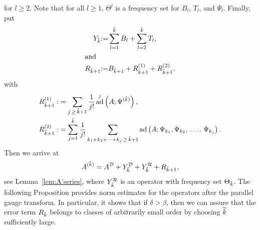 \documentclass[10pt]{amsart}
\theoremstyle{definition}\newtheorem{defi}[theo]{Definition}\newtheorem{rema}[theo]{Remark}\newtheorem{exam}[theo]{Example}\newtheorem{nota}[theo]{Notation}
\DeclareMathOperator{\ad}{ad}
\newcommand{\CD}{\mathcal{D}}
\newcommand{\CR}{\mathcal{R}}
\let\oldtilde\tilde
\renewcommand*{\tilde}[1]{\mathchoice{\widetilde{#1}}{\widetilde{#1}}{\oldtilde{#1}}{\oldtilde{#1}}}
\begin{document}
for $l\geq 2$. Note that for all $l\geq 1$, $\Theta^l$ is a frequency set for $B_l$, $T_l$, and $\Psi_l$. Finally, put
\begin{align}
Y_{\tilde{k}}&{:=}\sum\limits_{l=1}^{\tilde{k}}B_l+\sum\limits_{l=2}^{\tilde{k}}T_l,\label{eq:defpsiytildek}
\\
\intertext{and}
R_{\tilde{k}+1} &{:=}B_{\tilde{k}+1}+R_{\tilde{k}+1}^{(1)}+R_{\tilde{k}+1}^{(2)},\label{eq:defR}
\end{align}
with
\begin{equation}
\begin{split}
R_{\tilde{k}+1}^{(1)}:&=\sum\limits_{j\,\geq\,\tilde{k}+1}\frac{1}{j!}\ad^j\left(A;\Psi^{(\tilde k)}\right),\\
R_{\tilde{k}+1}^{(2)}:&=\sum\limits_{j=1}^{\tilde{k}}\frac{1}{j!}\sum\limits_{k_1+k_2+\dots + k_j\,\geq\, \tilde{k}+1}\ad\left(A;\Psi_{k_1},\Psi_{k_2},\,\dots,\,\Psi_{k_j}\right).
\end{split}
\end{equation}
Then we arrive at
\begin{equation}\label{eq:afterparallelgauge}
A^{(\tilde k)}=A^\CD+Y_{\tilde{k}}^{\CD}+Y_{\tilde{k}}^{\CR}+R_{\tilde{k}+1},
\end{equation}
see Lemma~\ref{lem:A'series}, where $Y_{\tilde{k}}^{\CR}$ is an operator with frequency set $\Theta_{\tilde{k}}$. The following Proposition provides norm estimates for the operators after the parallel gauge transform. In particular, it shows that if $\delta>\beta$, then we can assure that the error term $R_{\tilde{k}}$ belongs to classes of arbitrarily small order by choosing $\tilde{k}$ sufficiently large.
\end{document}
